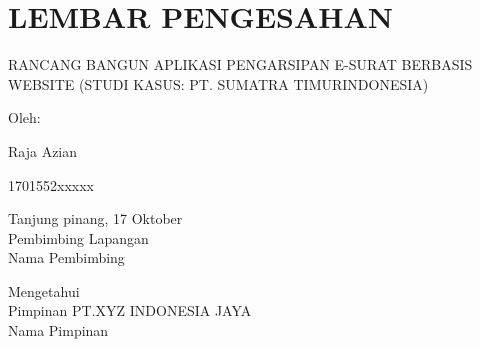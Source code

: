 \chapter*{\centering LEMBAR PENGESAHAN}

\thispagestyle{empty}


\begin{center}
    RANCANG BANGUN APLIKASI PENGARSIPAN E-SURAT BERBASIS WEBSITE (STUDI KASUS: PT. SUMATRA TIMURINDONESIA)
\end{center}

\vspace{1cm}

\begin{center}
    Oleh:
    \begin{multicols}{2}
        {Raja Azian}

        {1701552xxxxx}
    \end{multicols}

    \vspace{1cm}

    Tanjung pinang, 17 Oktober \the\year{}\\
    Pembimbing Lapangan \\
    \vspace{2cm}
    Nama Pembimbing \\

    \vspace{2.75cm}

    Mengetahui\\
    Pimpinan PT.XYZ INDONESIA JAYA \\
    \vspace{2cm}
    Nama Pimpinan
\end{center}